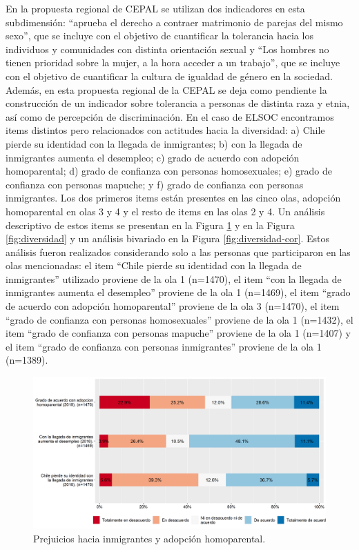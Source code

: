 \documentclass[
  12pt,
]{book}
\begin{document}
En la propuesta regional de CEPAL se utilizan dos indicadores en esta subdimensión: ``aprueba el derecho a contraer matrimonio de parejas del mismo sexo'', que se incluye con el objetivo de cuantificar la tolerancia hacia los individuos y comunidades con distinta orientación sexual y ``Los hombres no tienen prioridad sobre la mujer, a la hora acceder a un trabajo'', que se incluye con el objetivo de cuantificar la cultura de igualdad de género en la sociedad. Además, en esta propuesta regional de la CEPAL se deja como pendiente la construcción de un indicador sobre tolerancia a personas de distinta raza y etnia, así como de percepción de discriminación. En el caso de ELSOC encontramos items distintos pero relacionados con actitudes hacia la diversidad: a) Chile pierde su identidad con la llegada de inmigrantes; b) con la llegada de inmigrantes aumenta el desempleo; c) grado de acuerdo con adopción homoparental; d) grado de confianza con personas homosexuales; e) grado de confianza con personas mapuche; y f) grado de confianza con personas inmigrantes. Los dos primeros items están presentes en las cinco olas, adopción homoparental en olas 3 y 4 y el resto de items en las olas 2 y 4. Un análisis descriptivo de estos items se presentan en la Figura \ref{fig:prejuicios} y en la Figura \ref{fig:diversidad} y un análisis bivariado en la Figura \ref{fig:diversidad-cor}. Estos análisis fueron realizados considerando solo a las personas que participaron en las olas mencionadas: el item ``Chile pierde su identidad con la llegada de inmigrantes'' utilizado proviene de la ola 1 (n=1470), el item ``con la llegada de inmigrantes aumenta el desempleo'' proviene de la ola 1 (n=1469), el item ``grado de acuerdo con adopción homoparental'' proviene de la ola 3 (n=1470), el item ``grado de confianza con personas homosexuales'' proviene de la ola 1 (n=1432), el item ``grado de confianza con personas mapuche'' proviene de la ola 1 (n=1407) y el item ``grado de confianza con personas inmigrantes'' proviene de la ola 1 (n=1389).

\begin{figure}[H]

{\centering \includegraphics[width=1\linewidth,height=1\textheight]{output/graphs/prejuicios} 

}

\caption{Prejuicios hacia inmigrantes y adopción homoparental.}\label{fig:prejuicios}
\end{figure}
\end{document}
